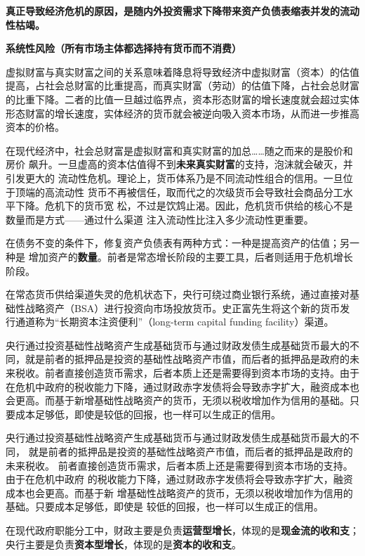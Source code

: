 \textbf{真正导致经济危机的原因，是随内外投资需求下降带来资产负债表缩表并发的流动性枯竭。}

\textbf{系统性风险（所有市场主体都选择持有货币而不消费）}

虚拟财富与真实财富之间的关系意味着降息将导致经济中虚拟财富（资本）的估值提高，占社会总财富的比重提高，而真实财富（劳动）的估值下降，占社会总财富的比重下降。二者的比值一旦越过临界点，资本形态财富的增长速度就会超过实体形态财富的增长速度，实体经济的货币就会被逆向吸入资本市场，从而进一步推高资本的价格。

在现代经济中，社会总财富是虚拟财富和真实财富的加总……随之而来的是股价和房价
飙升。一旦虚高的资本估值得不到\textbf{未来真实财富}的支持，泡沫就会破灭，并引发更大的
流动性危机。理论上，货币体系乃是不同流动性组合的信用。一旦位于顶端的高流动性
货币不再被信任，取而代之的次级货币会导致社会商品分工水平下降。危机下的货币宽
松，不过是饮鸩止渴。因此，危机货币供给的核心不是数量而是方式——通过什么渠道
注入流动性比注入多少流动性更重要。

在债务不变的条件下，修复资产负债表有两种方式：一种是提高资产的估值；另一种是
增加资产的\textbf{数量}。前者是常态增长阶段的主要工具，后者则适用于危机增长阶段。

在常态货币供给渠道失灵的危机状态下，央行可绕过商业银行系统，通过直接对基础性战略资产（BSA）进行投资向市场投放货币。史正富先生将这个新的货币发行通道称为“长期资本注资便利”（long-term capital funding facility）渠道。

央行通过投资基础性战略资产生成基础货币与通过财政发债生成基础货币最大的不同，就是前者的抵押品是投资的基础性战略资产市值，而后者的抵押品是政府的未来税收。前者直接创造货币需求，后者本质上还是需要得到资本市场的支持。由于在危机中政府的税收能力下降，通过财政赤字发债将会导致赤字扩大，融资成本也会更高。而基于新增基础性战略资产的货币，无须以税收增加作为信用的基础。只要成本足够低，即使是较低的回报，也一样可以生成正的信用。

央行通过投资基础性战略资产生成基础货币与通过财政发债生成基础货币最大的不同，
就是前者的抵押品是投资的基础性战略资产市值，而后者的抵押品是政府的未来税收。
前者直接创造货币需求，后者本质上还是需要得到资本市场的支持。由于在危机中政府
的税收能力下降，通过财政赤字发债将会导致赤字扩大，融资成本也会更高。而基于新
增基础性战略资产的货币，无须以税收增加作为信用的基础。只要成本足够低，即使是
较低的回报，也一样可以生成正的信用。

在现代政府职能分工中，财政主要是负责\textbf{运营型增长}，体现的是\textbf{现金流的收和支}；
央行主要是负责\textbf{资本型增长}，体现的是\textbf{资本的收和支}。

